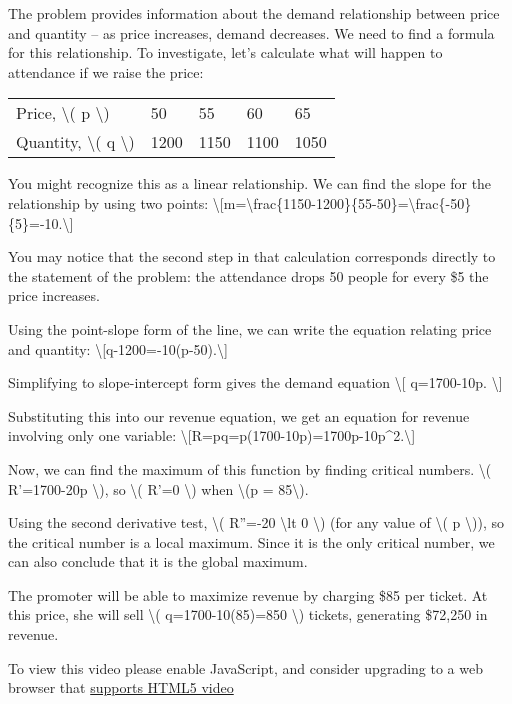 The problem provides information about the demand relationship between
price and quantity -- as price increases, demand decreases. We need to
find a formula for this relationship. To investigate, let's calculate
what will happen to attendance if we raise the price:

\begin{longtable}[]{@{}lllll@{}}
\toprule
\endhead
Price, \textbackslash{}( p \textbackslash{}) & 50 & 55 & 60 &
65\tabularnewline
Quantity, \textbackslash{}( q \textbackslash{}) & 1200 & 1150 & 1100 &
1050\tabularnewline
\bottomrule
\end{longtable}

You might recognize this as a linear relationship. We can find the slope
for the relationship by using two points:
\textbackslash{}{[}m=\textbackslash{}frac\{1150-1200\}\{55-50\}=\textbackslash{}frac\{-50\}\{5\}=-10.\textbackslash{}{]}

You may notice that the second step in that calculation corresponds
directly to the statement of the problem: the attendance drops 50 people
for every \$5 the price increases.

Using the point-slope form of the line, we can write the equation
relating price and quantity:
\textbackslash{}{[}q-1200=-10(p-50).\textbackslash{}{]}

Simplifying to slope-intercept form gives the demand equation
\textbackslash{}{[} q=1700-10p. \textbackslash{}{]}

Substituting this into our revenue equation, we get an equation for
revenue involving only one variable:
\textbackslash{}{[}R=pq=p(1700-10p)=1700p-10p\^{}2.\textbackslash{}{]}

Now, we can find the maximum of this function by finding critical
numbers. \textbackslash{}( R'=1700-20p \textbackslash{}), so
\textbackslash{}( R'=0 \textbackslash{}) when \textbackslash{}(p =
85\textbackslash{}).

Using the second derivative test, \textbackslash{}( R''=-20
\textbackslash{}lt 0 \textbackslash{}) (for any value of
\textbackslash{}( p \textbackslash{})), so the critical number is a
local maximum. Since it is the only critical number, we can also
conclude that it is the global maximum.

The promoter will be able to maximize revenue by charging \$85 per
ticket. At this price, she will sell \textbackslash{}( q=1700-10(85)=850
\textbackslash{}) tickets, generating \$72,250 in revenue.

To view this video please enable JavaScript, and consider upgrading to a
web browser that \href{http://videojs.com/html5-video-support/}{supports
HTML5 video}

